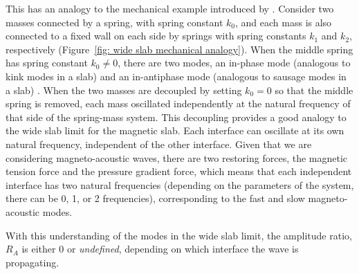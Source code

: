 \documentclass[namedreferences]{solarphysics}
\numberwithin{equation}{section}
\begin{document}
\begin{article}
This has an analogy to the mechanical example introduced by \citealt{all_etal17}. Consider two masses connected by a spring, with spring constant $k_0$, and each mass is also connected to a fixed wall on each side by springs with spring constants $k_1$ and $k_2$, respectively (Figure~\ref{fig: wide slab mechanical analogy}). When the middle spring has spring constant $k_0 \neq 0$, there are two modes, an in-phase mode (analogous to kink modes in a slab) and an in-antiphase mode (analogous to sausage modes in a slab) \citep{all_etal17}. When the two masses are decoupled by setting $k_0 = 0$ so that the middle spring is removed, each mass oscillated independently at the natural frequency of that side of the spring-mass system. This decoupling provides a good analogy to the wide slab limit for the magnetic slab. Each interface can oscillate at its own natural frequency, independent of the other interface. Given that we are considering magneto-acoustic waves, there are two restoring forces, the magnetic tension force and the pressure gradient force, which means that each independent interface has two natural frequencies (depending on the parameters of the system, there can be 0, 1, or 2 frequencies), corresponding to the fast and slow magneto-acoustic modes.

With this understanding of the modes in the wide slab limit, the amplitude ratio, $R_A$ is either $0$ or \textit{undefined}, depending on which interface the wave is propagating.

\begin{figure}
\end{figure}
\end{article}
\end{document}
